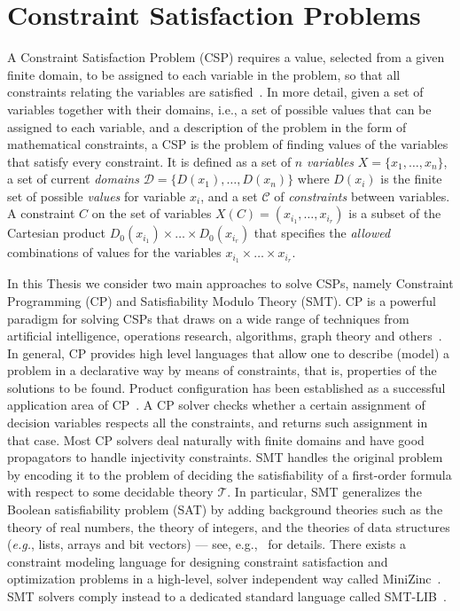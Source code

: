 \section{Constraint Satisfaction Problems}

A Constraint Satisfaction Problem (CSP) requires a value, selected 
from a given finite domain, to be assigned to each variable in the 
problem, so that all constraints relating the variables are
satisfied~\cite{brailsford1999constraint}. In more detail, given a 
set of variables together with their domains, i.e., a set of possible 
values that can be assigned to each variable, and a description of 
the problem in the form of mathematical constraints, a CSP is the 
problem of finding values of the variables that satisfy every 
constraint. It is defined as a set of $n$ \textit{variables} 
$X = \{x_1, \ldots, x_n\}$, a set of current \textit{domains}
$\mathcal{D} = \{D(x_1), \ldots, D(x_n)\}$ where $D(x_i)$ is the
finite set of possible \textit{values} for variable $x_i$, and a 
set $\mathcal{C}$ of \textit{constraints} between variables.
A constraint $C$ on the set of variables $X(C) = (x_{i_1}, \ldots, 
x_{i_r})$ is a subset of the Cartesian product $D_0(x_{i_1}) \times 
\ldots \times D_0(x_{i_r})$ that specifies the \textit{allowed}
combinations of values for the variables $x_{i_1} \times \ldots
\times x_{i_r}$.
 
In this Thesis we consider two main approaches to solve CSPs, 
namely Constraint Programming (CP) and Satisfiability
Modulo Theory (SMT). CP is a powerful paradigm for solving CSPs
that draws on a wide range of techniques from artificial 
intelligence, operations research, algorithms, graph theory and 
others~\cite{rossi2006handbook}. In general, CP provides high level
languages that allow one to describe (model) a problem in a 
declarative way by means of constraints, that is, properties of the
solutions to be found. Product configuration has been established 
as a successful application area of CP~\cite{mcdonald2002case,
	jensen2004clab, benavides2005using, falkner2011modeling,
	hervieu2016practical}. A CP solver  checks whether a certain
assignment of decision variables respects all the constraints, 
and returns such assignment in that case. Most CP solvers deal 
naturally with finite domains and have good propagators to handle
injectivity constraints. SMT handles the original problem by 
encoding it to the problem of deciding the satisfiability of a 
first-order formula with respect to some decidable theory
$\mathcal{T}$. In particular, SMT generalizes the Boolean 
satisfiability problem (SAT) by adding background theories such 
as the theory of real numbers, the theory of integers, and the 
theories of data structures (\textit{e.g.}, lists, arrays and 
bit vectors) --- see, e.g.,~\cite{DBLP:series/faia/BarrettSST09}
for details. There exists a constraint modeling language for 
designing constraint satisfaction and optimization problems in 
a high-level, solver independent way called 
MiniZinc~\cite{marriott2014minizinc}. SMT solvers comply instead 
to a dedicated standard language called SMT-LIB~\cite{smtlib}.

